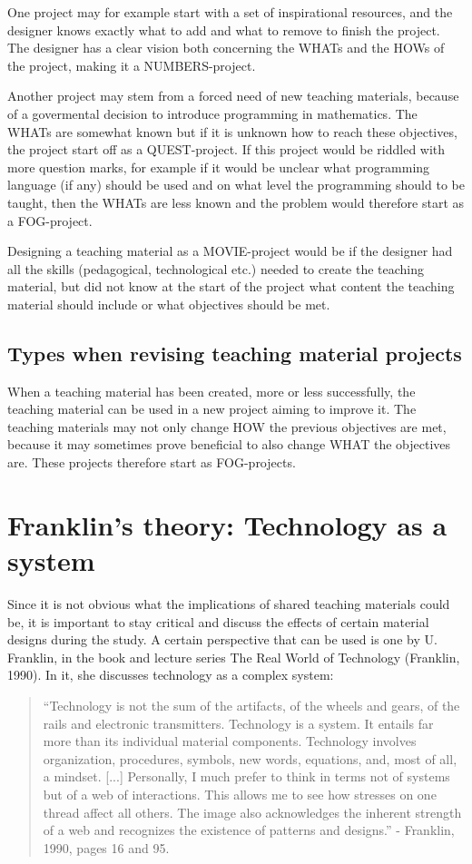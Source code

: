 One project may for example start with a set of inspirational resources, and the designer knows exactly what to add and what to remove to finish the project. The designer has a clear vision both concerning the WHATs and the HOWs of the project, making it a NUMBERS-project.

Another project may stem from a forced need of new teaching materials, because of a govermental decision to introduce programming in mathematics. The WHATs are somewhat known but if it is unknown how to reach these objectives, the project start off as a QUEST-project. If this project would be riddled with more question marks, for example if it would be unclear what programming language (if any) should be used and on what level the programming should to be taught, then the WHATs are less known and the problem would therefore start as a FOG-project.

Designing a teaching material as a MOVIE-project would be if the designer had all the skills (pedagogical, technological etc.) needed to create the teaching material, but did not know at the start of the project what content the teaching material should include or what objectives should be met.

\subsection{Types when revising teaching material projects}
When a teaching material has been created, more or less successfully, the teaching material can be used in a new project aiming to improve it. The teaching materials may not only change HOW the previous objectives are met, because it may sometimes prove beneficial to also change WHAT the objectives are. These projects therefore start as FOG-projects.



\section{Franklin's theory: Technology as a system}
Since it is not obvious what the implications of shared teaching materials could be, it is important to stay critical and discuss the effects of certain material designs during the study. A certain perspective that can be used is one by U. Franklin, in the book and lecture series The Real World of Technology (Franklin, 1990). In it, she discusses technology as a complex system:

\begin{quote}
“Technology is not the sum of the artifacts, of the wheels and gears, of the rails and electronic transmitters. Technology is a system. It entails far more than its individual material components. Technology involves organization, procedures, symbols, new words, equations, and, most of all, a mindset. [...] Personally, I much prefer to think in terms not of systems but of a web of interactions. This allows me to see how stresses on one thread affect all others. The image also acknowledges the inherent strength of a web and recognizes the existence of patterns and designs.” - Franklin, 1990, pages 16 and 95.
\end{quote}

